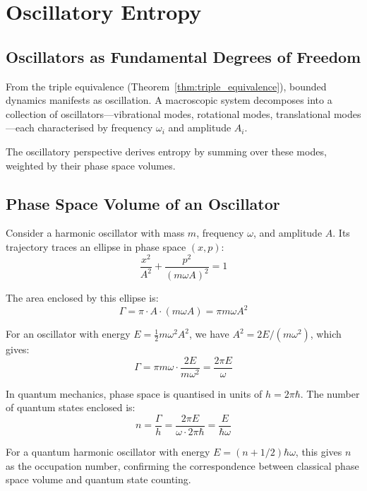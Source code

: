 \section{Oscillatory Entropy}
\label{sec:oscillatory}

\subsection{Oscillators as Fundamental Degrees of Freedom}

From the triple equivalence (Theorem~\ref{thm:triple_equivalence}), bounded dynamics manifests as oscillation. A macroscopic system decomposes into a collection of oscillators---vibrational modes, rotational modes, translational modes---each characterised by frequency $\omega_i$ and amplitude $A_i$.

The oscillatory perspective derives entropy by summing over these modes, weighted by their phase space volumes.

\subsection{Phase Space Volume of an Oscillator}

Consider a harmonic oscillator with mass $m$, frequency $\omega$, and amplitude $A$. Its trajectory traces an ellipse in phase space $(x, p)$:
\begin{equation}
\frac{x^2}{A^2} + \frac{p^2}{(m\omega A)^2} = 1
\end{equation}

The area enclosed by this ellipse is:
\begin{equation}
\Gamma = \pi \cdot A \cdot (m\omega A) = \pi m\omega A^2
\end{equation}

For an oscillator with energy $E = \frac{1}{2}m\omega^2 A^2$, we have $A^2 = 2E/(m\omega^2)$, which gives:
\begin{equation}
\Gamma = \pi m\omega \cdot \frac{2E}{m\omega^2} = \frac{2\pi E}{\omega}
\end{equation}

In quantum mechanics, phase space is quantised in units of $h = 2\pi\hbar$. The number of quantum states enclosed is:
\begin{equation}
n = \frac{\Gamma}{h} = \frac{2\pi E}{\omega \cdot 2\pi\hbar} = \frac{E}{\hbar\omega}
\end{equation}

For a quantum harmonic oscillator with energy $E = (n + 1/2)\hbar\omega$, this gives $n$ as the occupation number, confirming the correspondence between classical phase space volume and quantum state counting.

